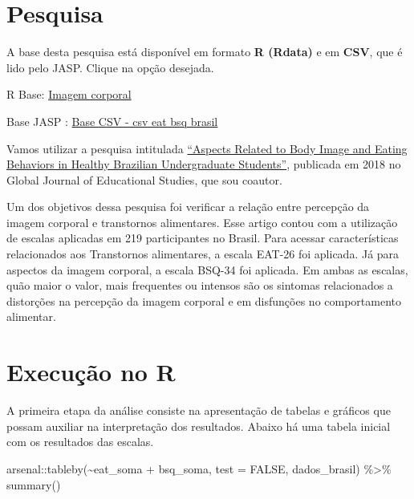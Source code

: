 \documentclass[
]{book}
\newenvironment{Shaded}{\begin{snugshade}}{\end{snugshade}}
\newcommand{\AttributeTok}[1]{\textcolor[rgb]{0.77,0.63,0.00}{#1}}
\newcommand{\ConstantTok}[1]{\textcolor[rgb]{0.00,0.00,0.00}{#1}}
\newcommand{\FunctionTok}[1]{\textcolor[rgb]{0.00,0.00,0.00}{#1}}
\newcommand{\NormalTok}[1]{#1}
\newcommand{\SpecialCharTok}[1]{\textcolor[rgb]{0.00,0.00,0.00}{#1}}
\newenvironment{base}{
  \definecolor{shadecolor}{rgb}{0.972,0.972,0.972}  %
  \color{black}
  \begin{shaded}}
 {\end{shaded}}
\begin{document}
\hypertarget{pesquisa-8}{%
\section{Pesquisa}\label{pesquisa-8}}

\begin{base}
A base desta pesquisa está disponível em formato \textbf{R (Rdata)} e em \textbf{CSV}, que é lido pelo JASP. Clique na opção desejada.

R Base: \href{https://github.com/anovabr/mqt/raw/master/bases/Base\%20R\%20-\%20imagem\%20corporal.RData}{Imagem corporal}

Base JASP : \href{https://github.com/anovabr/mqt/raw/master/bases/bases_csv_jasp.zip}{Base CSV - csv eat bsq brasil}

\end{base}

Vamos utilizar a pesquisa intitulada \href{https://www.researchgate.net/publication/323729370_Aspects_Related_to_Body_Image_and_Eating_Behaviors_in_Healthy_Brazilian_Undergraduate_Students}{``Aspects Related to Body Image and Eating Behaviors in Healthy Brazilian Undergraduate Students''}, publicada em 2018 no Global Journal of Educational Studies, que sou coautor.

Um dos objetivos dessa pesquisa foi verificar a relação entre percepção da imagem corporal e transtornos alimentares. Esse artigo contou com a utilização de escalas aplicadas em 219 participantes no Brasil. Para acessar características relacionados aos Transtornos alimentares, a escala EAT-26 foi aplicada. Já para aspectos da imagem corporal, a escala BSQ-34 foi aplicada. Em ambas as escalas, quão maior o valor, mais frequentes ou intensos são os sintomas relacionados a distorções na percepção da imagem corporal e em disfunções no comportamento alimentar.

\hypertarget{execuuxe7uxe3o-no-r-13}{%
\section{Execução no R}\label{execuuxe7uxe3o-no-r-13}}

A primeira etapa da análise consiste na apresentação de tabelas e gráficos que possam auxiliar na interpretação dos resultados. Abaixo há uma tabela inicial com os resultados das escalas.

\begin{Shaded}
\begin{Highlighting}[]
\NormalTok{arsenal}\SpecialCharTok{::}\FunctionTok{tableby}\NormalTok{(}\SpecialCharTok{\textasciitilde{}}\NormalTok{eat\_soma }\SpecialCharTok{+}\NormalTok{ bsq\_soma, }
                 \AttributeTok{test =} \ConstantTok{FALSE}\NormalTok{, dados\_brasil) }\SpecialCharTok{\%\textgreater{}\%} 
  \FunctionTok{summary}\NormalTok{() }
\end{Highlighting}
\end{Shaded}
\end{document}
